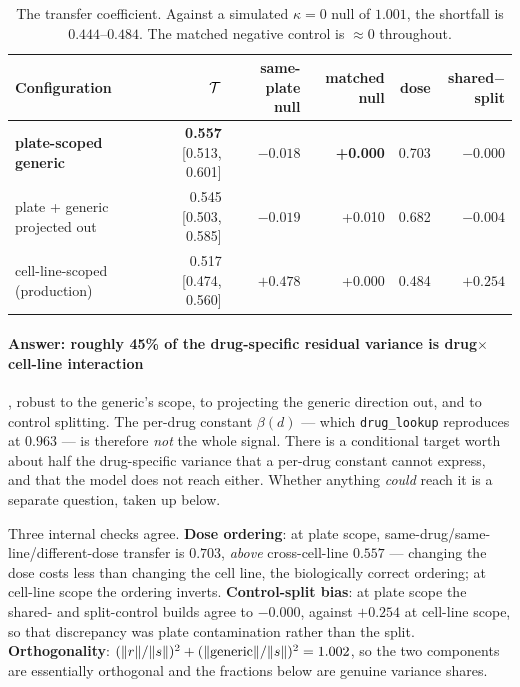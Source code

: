 \begin{table}[h]
\centering
\begin{tabular}{lrrrrr}
\toprule
Configuration & $\mathcal{T}$ & same-plate null & \textbf{matched null} & dose & shared$-$split \\
\midrule
\textbf{plate-scoped generic} & \textbf{0.557} [0.513, 0.601] & $-0.018$ & \textbf{+0.000} & 0.703 & $-0.000$ \\
plate + generic projected out & 0.545 [0.503, 0.585] & $-0.019$ & +0.010 & 0.682 & $-0.004$ \\
cell-line-scoped (production) & 0.517 [0.474, 0.560] & $+0.478$ & +0.000 & 0.484 & $+0.254$ \\
\bottomrule
\end{tabular}
\caption{The transfer coefficient. Against a simulated $\kappa = 0$ null of $1.001$, the shortfall is
$0.444$--$0.484$. The matched negative control is $\approx 0$ throughout.}
\label{tab:transfer}
\end{table}

\paragraph{Answer: roughly 45\% of the drug-specific residual variance is drug$\times$cell-line
interaction}, robust to the generic's scope, to projecting the generic direction out, and to control
splitting. The per-drug constant $\beta(d)$ --- which \texttt{drug\_lookup} reproduces at $0.963$ ---
is therefore \emph{not} the whole signal. There is a conditional target worth about half the
drug-specific variance that a per-drug constant cannot express, and that the model does not reach
either. Whether anything \emph{could} reach it is a separate question, taken up below.

Three internal checks agree. \textbf{Dose ordering}: at plate scope, same-drug/same-line/different-dose
transfer is $0.703$, \emph{above} cross-cell-line $0.557$ --- changing the dose costs less than
changing the cell line, the biologically correct ordering; at cell-line scope the ordering inverts.
\textbf{Control-split bias}: at plate scope the shared- and split-control builds agree to $-0.000$,
against $+0.254$ at cell-line scope, so that discrepancy was plate contamination rather than the split.
\textbf{Orthogonality}: $(\lVert r\rVert/\lVert s\rVert)^2 +
(\lVert\textrm{generic}\rVert/\lVert s\rVert)^2 = 1.002$, so the two components are essentially
orthogonal and the fractions below are genuine variance shares.


